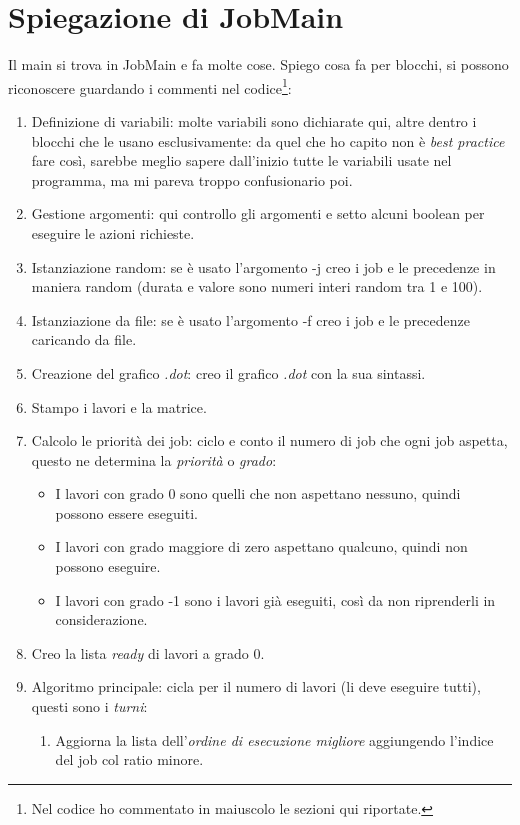 \documentclass[12pt, letterpaper]{article}
\begin{document}
\section{Spiegazione di JobMain}
Il main si trova in JobMain e fa molte cose.
Spiego cosa fa per blocchi, si possono riconoscere guardando i commenti nel codice\footnote{Nel codice ho commentato in maiuscolo le sezioni qui riportate.}:
\begin{enumerate}
\item{Definizione di variabili: molte variabili sono dichiarate qui, altre dentro i blocchi che le usano esclusivamente: da quel che ho capito non è \textit{best practice} fare così, sarebbe meglio sapere dall'inizio tutte le variabili usate nel programma, ma mi pareva troppo confusionario poi.}
\item{Gestione argomenti: qui controllo gli argomenti e setto alcuni boolean per eseguire le azioni richieste.}
\item{Istanziazione random: se è usato l'argomento -j creo i job e le precedenze in maniera random (durata e valore sono numeri interi random tra 1 e 100).}
\item{Istanziazione da file: se è usato l'argomento -f creo i job e le precedenze caricando da file.}
\item{Creazione del grafico \textit{.dot}: creo il grafico \textit{.dot} con la sua sintassi.}
\item{Stampo i lavori e la matrice.}
\item{Calcolo le priorità dei job: ciclo e conto il numero di job che ogni job aspetta, questo ne determina la \textit{priorità} o \textit{grado}:
	\begin{itemize}
	\item{I lavori con grado 0 sono quelli che non aspettano nessuno, quindi possono essere eseguiti.}
	\item{I lavori con grado maggiore di zero aspettano qualcuno, quindi non possono eseguire.}
	\item{I lavori con grado -1 sono i lavori già eseguiti, così da non riprenderli in considerazione.}
	\end{itemize}}
\item{Creo la lista \textit{ready} di lavori a grado 0.}
\item{Algoritmo principale: cicla per il numero di lavori (li deve eseguire tutti), questi sono i \textit{turni}:
\begin{enumerate}
\item{Aggiorna la lista dell'\textit{ordine di esecuzione migliore} aggiungendo l'indice del job col ratio minore.}

\end{enumerate}}
\end{enumerate}
\end{document}
